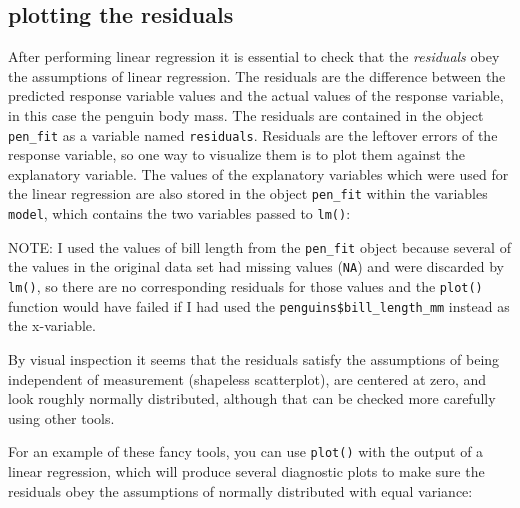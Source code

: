 \documentclass[
  letterpaper,
  DIV=11,
  numbers=noendperiod]{scrreprt}
\newenvironment{Shaded}{\begin{snugshade}}{\end{snugshade}}
\newcommand{\NormalTok}[1]{\textcolor[rgb]{0.00,0.23,0.31}{#1}}
\begin{document}
\hypertarget{plotting-the-residuals}{%
\subsection*{plotting the residuals}\label{plotting-the-residuals}}

After performing linear regression it is essential to check that the
\emph{residuals} obey the assumptions of linear regression. The
residuals are the difference between the predicted response variable
values and the actual values of the response variable, in this case the
penguin body mass. The residuals are contained in the object
\texttt{pen\_fit} as a variable named \texttt{residuals}. Residuals are
the leftover errors of the response variable, so one way to visualize
them is to plot them against the explanatory variable. The values of the
explanatory variables which were used for the linear regression are also
stored in the object \texttt{pen\_fit} within the variables
\texttt{model}, which contains the two variables passed to
\texttt{lm()}:

\begin{Shaded}
\end{Shaded}

NOTE: I used the values of bill length from the \texttt{pen\_fit} object
because several of the values in the original data set had missing
values (\texttt{NA}) and were discarded by \texttt{lm()}, so there are
no corresponding residuals for those values and the \texttt{plot()}
function would have failed if I had used the
\texttt{penguins\$bill\_length\_mm} instead as the x-variable.

By visual inspection it seems that the residuals satisfy the assumptions
of being independent of measurement (shapeless scatterplot), are
centered at zero, and look roughly normally distributed, although that
can be checked more carefully using other tools.

For an example of these fancy tools, you can use \texttt{plot()} with
the output of a linear regression, which will produce several diagnostic
plots to make sure the residuals obey the assumptions of normally
distributed with equal variance:
\end{document}
